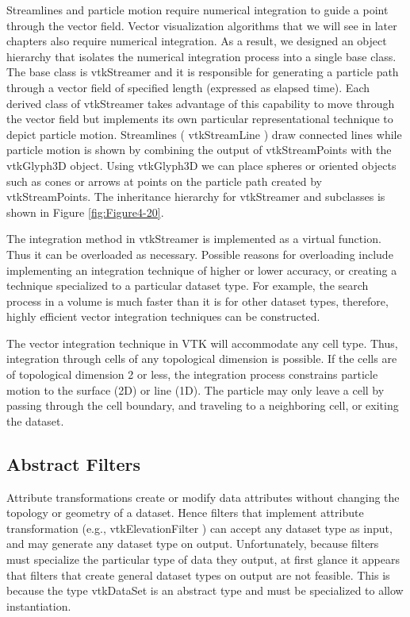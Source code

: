 Streamlines and particle motion require numerical integration to guide a point through the vector field. Vector visualization algorithms that we will see in later chapters also require numerical integration. As a result, we designed an object hierarchy that isolates the numerical integration process into a single base class. The base class is vtkStreamer and it is responsible for generating a particle path through a vector field of specified length (expressed as elapsed time). Each derived class of vtkStreamer takes advantage of this capability to move through the vector field but implements its own particular representational technique to depict particle motion. Streamlines ( vtkStreamLine ) draw connected lines while particle motion is shown by combining the output of vtkStreamPoints with the vtkGlyph3D object. Using vtkGlyph3D we can place spheres or oriented objects such as cones or arrows at points on the particle path created by vtkStreamPoints. The inheritance hierarchy for vtkStreamer and subclasses is shown in  Figure \ref{fig:Figure4-20}.

The integration method in vtkStreamer is implemented as a virtual function. Thus it can be overloaded as necessary. Possible reasons for overloading include implementing an integration technique of higher or lower accuracy, or creating a technique specialized to a particular dataset type. For example, the search process in a volume is much faster than it is for other dataset types, therefore, highly efficient vector integration techniques can be constructed.

The vector integration technique in VTK will accommodate any cell type. Thus, integration through cells of any topological dimension is possible. If the cells are of topological dimension 2 or less, the integration process constrains particle motion to the surface (2D) or line (1D). The particle may only leave a cell by passing through the cell boundary, and traveling to a neighboring cell, or exiting the dataset.

\subsection{Abstract Filters}

Attribute transformations create or modify data attributes without changing the topology or geometry of a dataset. Hence filters that implement attribute transformation (e.g., vtkElevationFilter ) can accept any dataset type as input, and may generate any dataset type on output. Unfortunately, because filters must specialize the particular type of data they output, at first glance it appears that filters that create general dataset types on output are not feasible. This is because the type vtkDataSet is an abstract type and must be specialized to allow instantiation.


